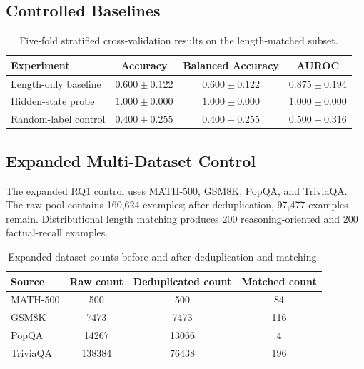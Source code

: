 \documentclass[11pt]{article}
\begin{document}
\subsection{Controlled Baselines}

\begin{table}[H]
    \centering
    \begin{tabular}{lccc}
        \toprule
        Experiment & Accuracy & Balanced Accuracy & AUROC \\
        \midrule
        Length-only baseline &
        \(0.600 \pm 0.122\) &
        \(0.600 \pm 0.122\) &
        \(0.875 \pm 0.194\) \\
        Hidden-state probe &
        \(1.000 \pm 0.000\) &
        \(1.000 \pm 0.000\) &
        \(1.000 \pm 0.000\) \\
        Random-label control &
        \(0.400 \pm 0.255\) &
        \(0.400 \pm 0.255\) &
        \(0.500 \pm 0.316\) \\
        \bottomrule
    \end{tabular}
    \caption{
    Five-fold stratified cross-validation results on the
    length-matched subset.
    }
    \label{tab:appendix-controlled-baselines}
\end{table}


\subsection{Expanded Multi-Dataset Control}

The expanded RQ1 control uses MATH-500, GSM8K, PopQA, and TriviaQA.
The raw pool contains 160,624 examples; after deduplication, 97,477
examples remain. Distributional length matching produces 200
reasoning-oriented and 200 factual-recall examples.

\begin{table}[H]
    \centering
    \begin{tabular}{lccc}
        \toprule
        Source & Raw count & Deduplicated count & Matched count \\
        \midrule
        MATH-500 & 500 & 500 & 84 \\
        GSM8K & 7473 & 7473 & 116 \\
        PopQA & 14267 & 13066 & 4 \\
        TriviaQA & 138384 & 76438 & 196 \\
        \bottomrule
    \end{tabular}
    \caption{Expanded dataset counts before and after deduplication and matching.}
    \label{tab:appendix-expanded-counts}
\end{table}
\end{document}
